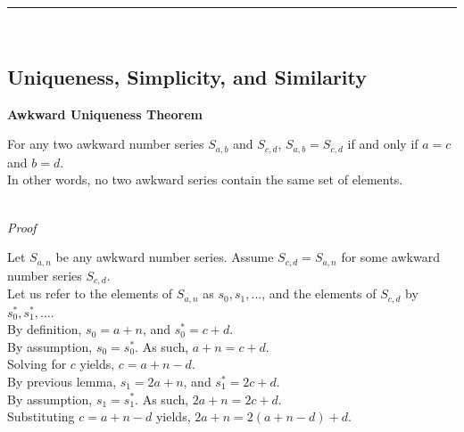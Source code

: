 \documentclass[a4paper,12pt]{article}
\begin{document}
\begin{center}
\noindent\rule{8cm}{0.4pt}
\end{center}
\noindent \\





\subsection{Uniqueness, Simplicity, and Similarity}



\label{theorem:awkward_uniqueness}
\hypertarget{theorem:awkward_uniqueness}{}
\begin{tcolorbox}
\textbf{Awkward Uniqueness Theorem}

\noindent For any two awkward number series $S_{a,b}$ and $S_{c,d}$, $S_{a,b} = S_{c,d}$ if and only if $a = c$ and $b = d$.\\

\noindent In other words, no two awkward series contain the same set of elements.
\end{tcolorbox}

\noindent \\
\textit{Proof}

\noindent Let $S_{a,n}$ be any awkward number series. Assume $S_{c, d} = S_{a, n}$ for some awkward number series $S_{c,d}$.\\


\noindent Let us refer to the elements of $S_{a,n}$ as $s_0, s_1, ...$, and the elements of $S_{c,d}$ by $s^*_0, s^*_1, ...$.\\

\noindent By definition, $s_0 = a + n$, and $s^*_0 = c + d$.\\

\noindent By assumption, $s_0 = s^*_0$. As such, $a + n = c + d$.\\

\noindent Solving for $c$ yields, $c = a + n - d$.\\

\noindent By previous lemma, $s_1 = 2a + n$, and $s^*_1 = 2c + d$.\\

\noindent By assumption, $s_1 = s^*_1$. As such, $2a + n = 2c + d$.\\

\noindent Substituting $c = a + n - d$ yields, $2a + n = 2(a + n - d) + d$.\\
\end{document}
